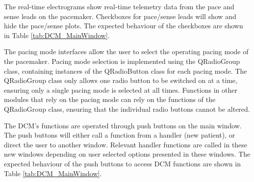 \documentclass[12pt]{article}
\begin{document}
The real-time electrograms show real-time telemetry data from the pace and sense leads on the pacemaker. Checkboxes for pace/sense leads will show and hide the pace/sense plots. The expected behaviour of the checkboxes are shown in Table \ref{tab:DCM_MainWindow}.

The pacing mode interfaces allow the user to select the operating pacing mode of the pacemaker. Pacing mode selection is implemented using the QRadioGroup class, containing instances of the QRadioButton class for each pacing mode. The QRadioGroup class only allows one radio button to be switched on at a time, ensuring only a single pacing mode is selected at all times. Functions in other modules that rely on the pacing mode can rely on the functions of the QRadioGroup class, ensuring that the individual radio buttons cannot be altered.

The DCM's functions are operated through push buttons on the main window. The push buttons will either call a function from a handler (new patient), or direct the user to another window. Relevant handler functions are called in these new windows depending on user selected options presented in these windows. The expected behaviour of the push buttons to access DCM functions are shown in Table \ref{tab:DCM_MainWindow}.
\end{document}
